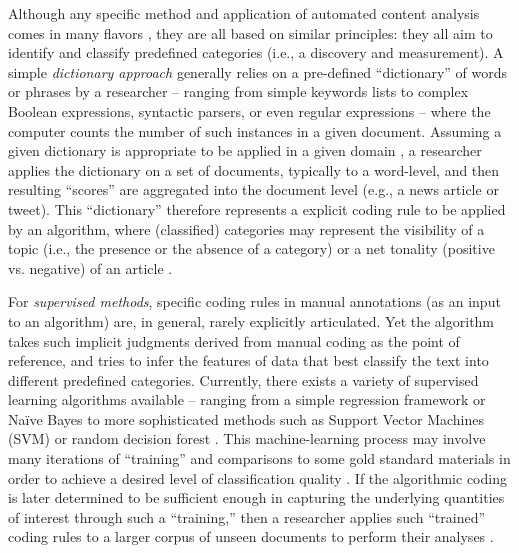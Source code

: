 \documentclass[man, 12pt, a4paper, nolmodern, noextraspace]{apa6}
\begin{document}
    Although any specific method and application of automated content analysis comes in many flavors \parencites[for a broad overview, see:][]{Boumans_Trilling_2016, grimmer2013text}, they are all based on similar principles: they all aim to identify and classify predefined categories (i.e., a discovery and measurement). A simple \textit{dictionary approach} generally relies on a pre-defined “dictionary” of words or phrases by a researcher -- ranging from simple keywords lists to complex Boolean expressions, syntactic parsers, or even regular expressions -- where the computer counts the number of such instances in a given document. Assuming a given dictionary is appropriate to be applied in a given domain \parencite{Boumans_Trilling_2016, gonzalez2015signals}, a researcher applies the dictionary on a set of documents, typically to a word-level, and then resulting \enquote{scores} are aggregated into the document level (e.g., a news article or tweet). This \enquote{dictionary} therefore represents a explicit coding rule to be applied by an algorithm, where (classified) categories may represent the visibility of a topic (i.e., the presence or the absence of a category) or a net tonality (positive vs. negative) of an article \parencites[e.g.,][]{Aaldering2016, YoungSoroka2012, boomgaaden2009, gonzalez2015signals, Rooduijn2011}. 
    
    For \textit{supervised methods}, specific coding rules in manual annotations (as an input to an algorithm) are, in general, rarely explicitly articulated. Yet the algorithm takes such implicit judgments derived from manual coding as the point of reference, and tries to infer the features of data that best classify the text into different predefined categories. Currently, there exists a variety of supervised learning algorithms available -- ranging from a simple regression framework or Naïve Bayes to more sophisticated methods such as Support Vector Machines (SVM) or random decision forest \parencites[for an overview, see][]{hindman2015building}. This machine-learning process may involve many iterations of \enquote{training} and comparisons to some gold standard materials in order to achieve a desired level of classification quality \parencites[e.g.,][]{scharkow2013thematic}. If the algorithmic coding is later determined to be sufficient enough in capturing the underlying quantities of interest through such a \enquote{training,} then a researcher applies such \enquote{trained} coding rules to a larger corpus of unseen documents to perform their analyses \parencites[e.g.,][]{burscher2015using, burscher2014teaching, scharkow2013thematic, gonzalez2015signals}.    
    
\end{document}
